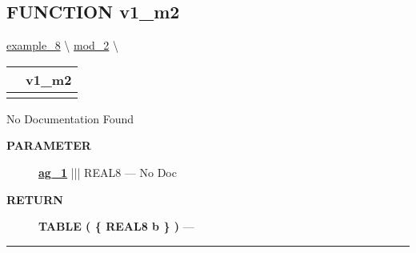 \subsection*{\textsf{\colorbox{headtoc}{\color{white} FUNCTION}
v1\_m2}}

\hypertarget{ecldoc:intest.example_8.mod_2.v1_m2}{}
\hspace{0pt} \hyperlink{ecldoc:intest.example_8}{example_8} \textbackslash 
\hspace{0pt} \hyperlink{ecldoc:intest.example_8.mod_2}{mod_2} \textbackslash 

{\renewcommand{\arraystretch}{1.5}
\begin{tabularx}{\textwidth}{|>{\raggedright\arraybackslash}l|X|}
\hline
\hspace{0pt}\mytexttt{\color{red} } & \textbf{v1\_m2} \\
\hline
\multicolumn{2}{|>{\raggedright\arraybackslash}X|}{\hspace{0pt}\mytexttt{\color{param} (REAL8 ag\_1)}} \\
\hline
\end{tabularx}
}

\par





No Documentation Found






\par
\begin{description}
\item [\colorbox{tagtype}{\color{white} \textbf{\textsf{PARAMETER}}}] \textbf{\underline{ag\_1}} ||| REAL8 --- No Doc
\end{description}







\par
\begin{description}
\item [\colorbox{tagtype}{\color{white} \textbf{\textsf{RETURN}}}] \textbf{TABLE ( \{ REAL8 b \} )} --- 
\end{description}




\rule{\linewidth}{0.5pt}




